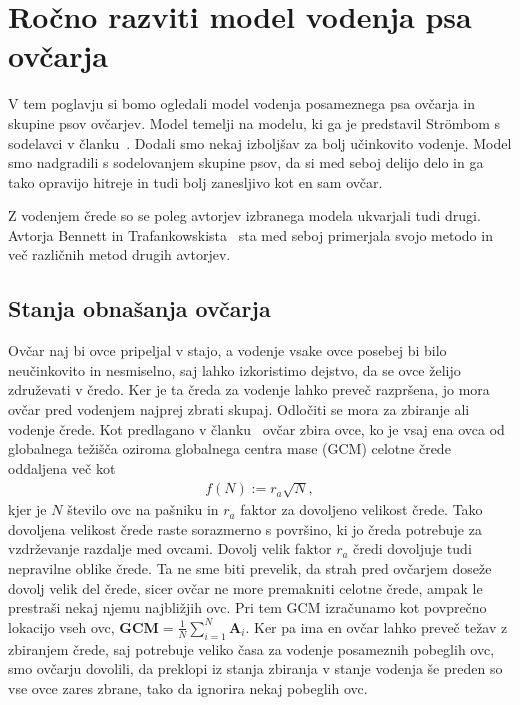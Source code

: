 \section{Ročno razviti model vodenja psa ovčarja}

V tem poglavju si bomo ogledali model vodenja posameznega psa ovčarja in skupine psov ovčarjev. Model temelji na modelu, ki ga je predstavil Str{\"o}mbom s sodelavci v članku~\cite{Stroembom}. Dodali smo nekaj izboljšav za bolj učinkovito vodenje. Model smo nadgradili s sodelovanjem skupine psov, da si med seboj delijo delo in ga tako opravijo hitreje in tudi bolj zanesljivo kot en sam ovčar.

Z vodenjem črede so se poleg avtorjev izbranega modela ukvarjali tudi drugi. Avtorja Bennett in Trafankowskista~\cite{comparative} sta med seboj primerjala svojo metodo in več različnih metod drugih avtorjev.

\subsection{Stanja obnašanja ovčarja}

Ovčar naj bi ovce pripeljal v stajo, a vodenje vsake ovce posebej bi bilo neučinkovito in nesmiselno, saj lahko izkoristimo dejstvo, da se ovce želijo združevati v čredo. Ker je ta čreda za vodenje lahko preveč razpršena, jo mora ovčar pred vodenjem najprej zbrati skupaj. Odločiti se mora za zbiranje ali vodenje črede. Kot predlagano v članku~\cite{Stroembom} ovčar zbira ovce, ko je vsaj ena ovca od globalnega težišča oziroma globalnega centra mase (GCM) celotne črede oddaljena več kot 
\begin{align}
f(N) := r_a\sqrt{N}, \label{eq:fN}
\end{align}
kjer je $N$ število ovc na pašniku in $r_a$ faktor za dovoljeno velikost črede. Tako dovoljena velikost črede raste sorazmerno s površino, ki jo čreda potrebuje za vzdrževanje razdalje med ovcami. Dovolj velik faktor $r_a$ čredi dovoljuje tudi nepravilne oblike črede. Ta ne sme biti prevelik, da strah pred ovčarjem doseže dovolj velik del črede, sicer ovčar ne more premakniti celotne črede, ampak le prestraši nekaj njemu najbližjih ovc. Pri tem GCM izračunamo kot povprečno lokacijo vseh ovc, $\mathbf{GCM} = \frac{1}{N}\sum_{i=1}^N \mathbf{A}_i$. Ker pa ima en ovčar lahko preveč težav z zbiranjem črede, saj potrebuje veliko časa za vodenje posameznih pobeglih ovc, smo ovčarju dovolili, da preklopi iz stanja zbiranja v stanje vodenja še preden so vse ovce zares zbrane, tako da ignorira nekaj pobeglih ovc.

